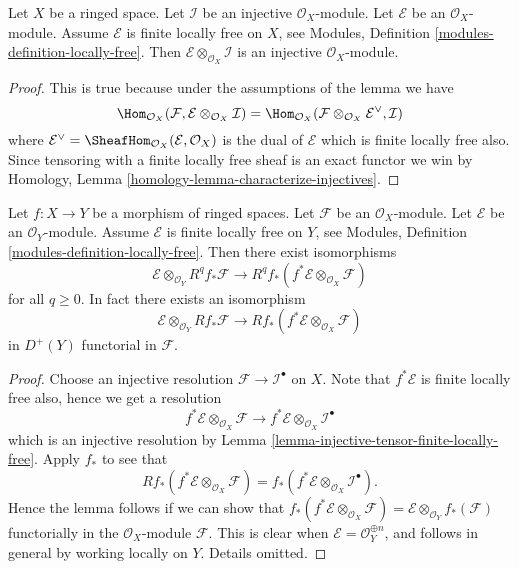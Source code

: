 \begin{lemma}
\label{lemma-injective-tensor-finite-locally-free}
Let $X$ be a ringed space.
Let $\mathcal{I}$ be an injective $\mathcal{O}_X$-module.
Let $\mathcal{E}$ be an $\mathcal{O}_X$-module.
Assume $\mathcal{E}$ is finite locally free on $X$, see
Modules, Definition \ref{modules-definition-locally-free}.
Then $\mathcal{E} \otimes_{\mathcal{O}_X} \mathcal{I}$ is
an injective $\mathcal{O}_X$-module.
\end{lemma}

\begin{proof}
This is true because under the assumptions of the lemma we have
$$
\Hom_{\mathcal{O}_X}(\mathcal{F},
\mathcal{E} \otimes_{\mathcal{O}_X} \mathcal{I})
=
\Hom_{\mathcal{O}_X}(
\mathcal{F} \otimes_{\mathcal{O}_X} \mathcal{E}^\vee, \mathcal{I})
$$
where
$\mathcal{E}^\vee = \SheafHom_{\mathcal{O}_X}(\mathcal{E}, \mathcal{O}_X)$
is the dual of $\mathcal{E}$ which is finite locally free also. Since tensoring
with a finite locally free sheaf is an exact functor we win by
Homology, Lemma \ref{homology-lemma-characterize-injectives}.
\end{proof}

\begin{lemma}
\label{lemma-projection-formula}
Let $f : X \to Y$ be a morphism of ringed spaces.
Let $\mathcal{F}$ be an $\mathcal{O}_X$-module.
Let $\mathcal{E}$ be an $\mathcal{O}_Y$-module.
Assume $\mathcal{E}$ is finite locally free on $Y$, see
Modules, Definition \ref{modules-definition-locally-free}.
Then there exist isomorphisms
$$
\mathcal{E} \otimes_{\mathcal{O}_Y} R^qf_*\mathcal{F}
\longrightarrow
R^qf_*(f^*\mathcal{E} \otimes_{\mathcal{O}_X} \mathcal{F})
$$
for all $q \geq 0$. In fact there exists an isomorphism
$$
\mathcal{E} \otimes_{\mathcal{O}_Y} Rf_*\mathcal{F}
\longrightarrow
Rf_*(f^*\mathcal{E} \otimes_{\mathcal{O}_X} \mathcal{F})
$$
in $D^{+}(Y)$ functorial in $\mathcal{F}$.
\end{lemma}

\begin{proof}
Choose an injective resolution $\mathcal{F} \to \mathcal{I}^\bullet$
on $X$. Note that $f^*\mathcal{E}$ is finite locally free also, hence
we get a resolution
$$
f^*\mathcal{E} \otimes_{\mathcal{O}_X} \mathcal{F}
\longrightarrow
f^*\mathcal{E} \otimes_{\mathcal{O}_X} \mathcal{I}^\bullet
$$
which is an injective resolution by
Lemma \ref{lemma-injective-tensor-finite-locally-free}.
Apply $f_*$ to see that
$$
Rf_*(f^*\mathcal{E} \otimes_{\mathcal{O}_X} \mathcal{F})
=
f_*(f^*\mathcal{E} \otimes_{\mathcal{O}_X} \mathcal{I}^\bullet).
$$
Hence the lemma follows if we can show that
$f_*(f^*\mathcal{E} \otimes_{\mathcal{O}_X} \mathcal{F}) =
\mathcal{E} \otimes_{\mathcal{O}_Y} f_*(\mathcal{F})$ functorially
in the $\mathcal{O}_X$-module $\mathcal{F}$. This is clear when
$\mathcal{E} = \mathcal{O}_Y^{\oplus n}$, and follows in general
by working locally on $Y$. Details omitted.
\end{proof}

